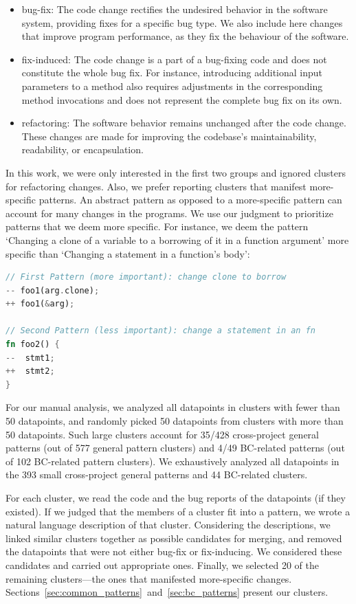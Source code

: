 \begin{itemize}
    \item bug-fix: The code change rectifies the undesired behavior in the software system, providing fixes for a specific bug type. We also include here changes that improve program performance, as they fix the behaviour of the software.

    \item fix-induced: The code change is a part of a bug-fixing code and does not constitute the whole bug fix. For instance, introducing additional input parameters to a method also requires adjustments in the corresponding method invocations and does not represent the complete bug fix on its own.
    
    \item refactoring: The software behavior remains unchanged after the code change. These changes are made for improving the codebase's maintainability, readability, or encapsulation.
\end{itemize}

In this work, we were only interested in the first two groups and ignored clusters for refactoring changes. Also, we prefer reporting clusters that manifest more-specific patterns. An abstract pattern as opposed to a more-specific pattern can account for many changes in the programs. We use our judgment to prioritize patterns that we deem more specific. For instance, we deem the pattern `Changing a clone of a variable to a borrowing of it in a function argument' more specific than `Changing a statement in a function's body':

\begin{lstlisting}[language=Rust, style=colouredRust]
// First Pattern (more important): change clone to borrow
-- foo1(arg.clone);
++ foo1(&arg);

// Second Pattern (less important): change a statement in an fn
fn foo2() {
--  stmt1;
++  stmt2;
}

\end{lstlisting}


For our manual analysis, we analyzed all datapoints in clusters with fewer than 50 datapoints, and randomly picked 50 datapoints from clusters with more than 50 datapoints. Such large clusters account for 35/428 cross-project general patterns (out of 577 general pattern clusters) and 4/49 BC-related patterns (out of 102 BC-related pattern clusters). We exhaustively analyzed all datapoints in the 393 small cross-project general patterns and 44 BC-related clusters.

For each cluster, we read the code and the bug reports of the datapoints (if they existed). If we judged that the members of a cluster fit into a pattern, we wrote a natural language description of that cluster. Considering the descriptions, we linked similar clusters together as possible candidates for merging, and removed the datapoints that were not either bug-fix or fix-inducing. We considered these candidates and carried out appropriate ones. Finally, we selected 20 of the remaining clusters---the ones that manifested more-specific changes. Sections~\ref{sec:common_patterns}~and~\ref{sec:bc_patterns} present our clusters.
